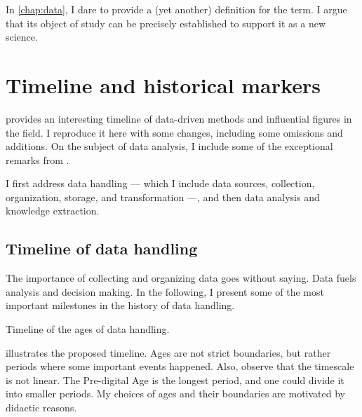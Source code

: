 In \cref{chap:data}, I dare to provide a (yet another) definition for the term.  I
argue that its object of study can be precisely established to support it as a new
science.

\section{Timeline and historical markers}

\textcite{Kelleher2018} provides an interesting timeline of data-driven methods and
influential figures in the field.  I reproduce it here with some changes, including
some omissions and additions.  On the subject of data analysis, I include some of the
exceptional remarks
from \textcite{Vapnik1999b}.

I first address data handling --- which I include data sources, collection, organization,
storage, and transformation ---, and then data analysis and knowledge extraction.

\subsection{Timeline of data handling}
\label{sub:time-handling}

The importance of collecting and organizing data goes without saying.  Data fuels analysis and
decision making.  In the following, I present some of the most important milestones in the history
of data handling.

\begin{figurebox}[label=fig:data-handling-history]{Timeline of the ages of data handling.}
  \centering
\end{figurebox}

 illustrates the proposed timeline.  Ages are not strict
boundaries, but rather periods where some important events happened.  Also, observe that
the timescale is not linear.  The Pre-digital Age is the longest period, and one could
divide it into smaller periods.  My choices of ages and their boundaries are motivated by
didactic reasons.


